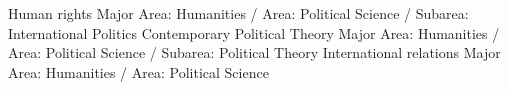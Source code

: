 
\begin{cvcitems}
  \cvcitem
    {Human rights}
    {Major Area: Humanities / Area: Political Science / Subarea: International Politics}
   \cvcitem
    {Contemporary Political Theory}
    {Major Area: Humanities / Area: Political Science / Subarea: Political Theory}
   \cvcitem
    {International relations}
    {Major Area: Humanities / Area: Political Science}
\end{cvcitems}
